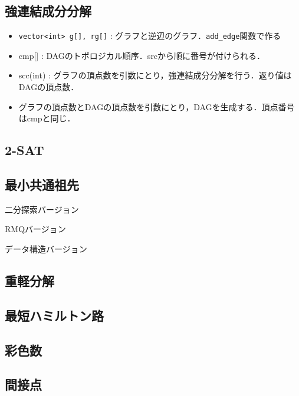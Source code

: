 \subsection{強連結成分分解}
\begin{itemize}
  \item \verb#vector<int> g[], rg[]# : グラフと逆辺のグラフ．\verb#add_edge#関数で作る
  \item cmp[] : DAGのトポロジカル順序．srcから順に番号が付けられる．
  \item scc(int) : グラフの頂点数を引数にとり，強連結成分分解を行う．返り値はDAGの頂点数．
  \item グラフの頂点数とDAGの頂点数を引数にとり，DAGを生成する．頂点番号はcmpと同じ．
\end{itemize}


\subsection{2-SAT}


\subsection{最小共通祖先}
二分探索バージョン

RMQバージョン

データ構造バージョン


\subsection{重軽分解}


\subsection{最短ハミルトン路}


\subsection{彩色数}


\subsection{間接点}


